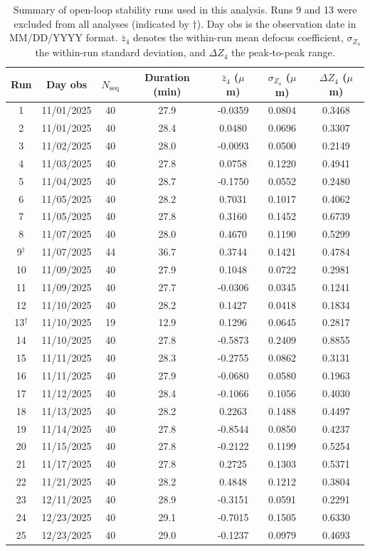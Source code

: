 \documentclass[SE,authoryear,toc]{lsstdoc}
\begin{document}
\begin{table}[!h]
\centering
\caption{Summary of open-loop stability runs used in this analysis. Runs 9 and 13 were excluded from all analyses (indicated by $\dagger$). Day obs is the observation date in MM/DD/YYYY format. $\bar{z}_4$ denotes the within-run mean defocus coefficient, $\sigma_{Z_4}$ the within-run standard deviation, and $\Delta Z_4$ the peak-to-peak range.}
\label{tab:run_summary}
\begin{tabular}{ccccccc}
\toprule
\textbf{Run} & \textbf{Day obs} & \textbf{$N_\text{seq}$} & \textbf{Duration (min)} & \textbf{$\bar{z}_4$ ($\mu$m)} & \textbf{$\sigma_{Z_4}$ ($\mu$m)} & \textbf{$\Delta Z_4$ ($\mu$m)} \\
\midrule
1  & 11/01/2025 & 40 & 27.9 & -0.0359 & 0.0804 & 0.3468 \\
2  & 11/01/2025 & 40 & 28.4 & 0.0480 & 0.0696 & 0.3307 \\
3  & 11/02/2025 & 40 & 28.0 & -0.0093 & 0.0500 & 0.2149 \\
4  & 11/03/2025 & 40 & 27.8 & 0.0758 & 0.1220 & 0.4941 \\
5  & 11/04/2025 & 40 & 28.7 & -0.1750 & 0.0552 & 0.2480 \\
6  & 11/05/2025 & 40 & 28.2 & 0.7031 & 0.1017 & 0.4062 \\
7  & 11/05/2025 & 40 & 27.8 & 0.3160 & 0.1452 & 0.6739 \\
8  & 11/07/2025 & 40 & 28.0 & 0.4670 & 0.1190 & 0.5299 \\
9$^\dagger$  & 11/07/2025 & 44 & 36.7 & 0.3744 & 0.1421 & 0.4784 \\
10 & 11/09/2025 & 40 & 27.9 & 0.1048 & 0.0722 & 0.2981 \\
11 & 11/09/2025 & 40 & 27.7 & -0.0306 & 0.0345 & 0.1241 \\
12 & 11/10/2025 & 40 & 28.2 & 0.1427 & 0.0418 & 0.1834 \\
13$^\dagger$ & 11/10/2025 & 19 & 12.9 & 0.1296 & 0.0645 & 0.2817 \\
14 & 11/10/2025 & 40 & 27.8 & -0.5873 & 0.2409 & 0.8855 \\
15 & 11/11/2025 & 40 & 28.3 & -0.2755 & 0.0862 & 0.3131 \\
16 & 11/11/2025 & 40 & 27.9 & -0.0680 & 0.0580 & 0.1963 \\
17 & 11/12/2025 & 40 & 28.4 & -0.1066 & 0.1056 & 0.4030 \\
18 & 11/13/2025 & 40 & 28.2 & 0.2263 & 0.1488 & 0.4497 \\
19 & 11/14/2025 & 40 & 27.8 & -0.8544 & 0.0850 & 0.4237 \\
20 & 11/15/2025 & 40 & 27.8 & -0.2122 & 0.1199 & 0.5254 \\
21 & 11/17/2025 & 40 & 27.8 & 0.2725 & 0.1303 & 0.5371 \\
22 & 11/21/2025 & 40 & 28.2 & 0.4848 & 0.1212 & 0.3804 \\
23 & 12/11/2025 & 40 & 28.9 & -0.3151 & 0.0591 & 0.2291 \\
24 & 12/23/2025 & 40 & 29.1 & -0.7015 & 0.1505 & 0.6330 \\
25 & 12/23/2025 & 40 & 29.0 & -0.1237 & 0.0979 & 0.4693 \\
\bottomrule
\end{tabular}
\end{table}
\end{document}
